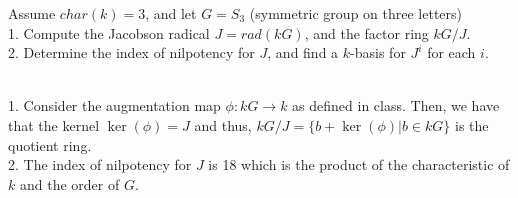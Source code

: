 Assume $char(k)=3$, and let $G=S_3$ (symmetric group on three letters)\\
1. Compute the Jacobson radical $J=rad(kG)$, and the factor ring $kG/J$.\\
2. Determine the index of nilpotency for $J$, and find a $k$-basis for $J^i$ for each $i$.\\

\begin{solution}\renewcommand{\qedsymbol}{}\ \\
    1. Consider the augmentation map $\phi:kG\rightarrow k$ as defined in class. Then, we have that the
    kernel $\ker(\phi)=J$ and thus, $kG/J=\{b+\ker(\phi)|b\in kG\}$ is the quotient ring.\\

    2. The index of nilpotency for $J$ is 18 which is the product of the characteristic of $k$ and the
    order of $G$.

\end{solution}
